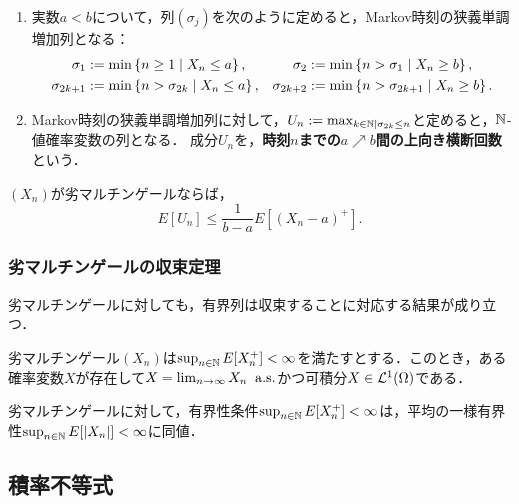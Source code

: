 \documentclass[uplatex,dvipdfmx]{jsreport}
\begin{document}
\begin{definition}\mbox{}
    \begin{enumerate}
        \item 実数$a<b$について，列$(\sigma_j)$を次のように定めると，Markov時刻の狭義単調増加列となる：
        \begin{align*}
            \sigma_1&:=\min\left\{n\ge 1\mid X_n\le a\right\},&\sigma_2&:=\min\left\{n>\sigma_1\mid X_n\ge b\right\},\\
            \sigma_{2k+1}&:=\min\left\{n>\sigma_{2k}\mid X_n\le a\right\},&\sigma_{2k+2}&:=\min\left\{n>\sigma_{2k+1}\mid X_n\ge b\right\}.
        \end{align*}
        \item Markov時刻の狭義単調増加列に対して，$U_n:=\max_{k\in\mathbb{N}\mid\sigma_{2k}\le n}$と定めると，$\mathbb{N}$-値確率変数の列となる．
        成分$U_n$を，\textbf{時刻$n$までの$a\nearrow b$間の上向き横断回数}という．
    \end{enumerate}
\end{definition}

\begin{theorem}
    $(X_n)$が劣マルチンゲールならば，
    \[E[U_n]\le\frac{1}{b-a}E[(X_n-a)^+].\]
\end{theorem}

\subsubsection{劣マルチンゲールの収束定理}

\begin{tcolorbox}[colframe=ForestGreen, colback=ForestGreen!10!white,breakable,colbacktitle=ForestGreen!40!white,coltitle=black,fonttitle=\bfseries\sffamily,
title=]
    劣マルチンゲールに対しても，有界列は収束することに対応する結果が成り立つ．
\end{tcolorbox}

\begin{theorem}
    劣マルチンゲール$(X_n)$は$\sup_{n\in\mathbb{N}}E[X_n^+]<\infty$を満たすとする．このとき，ある確率変数$X$が存在して$X=\lim_{n\to\infty}X_n\;\;\mathrm{a.s.}$かつ可積分$X\in\mathcal{L}^1(\Omega)$である．
\end{theorem}
\begin{remarks}
    劣マルチンゲールに対して，有界性条件$\sup_{n\in\mathbb{N}}E[X_n^+]<\infty$は，平均の一様有界性$\sup_{n\in\mathbb{N}}E[\lvert X_n\rvert]<\infty$に同値．
\end{remarks}

\subsection{積率不等式}
\end{document}
